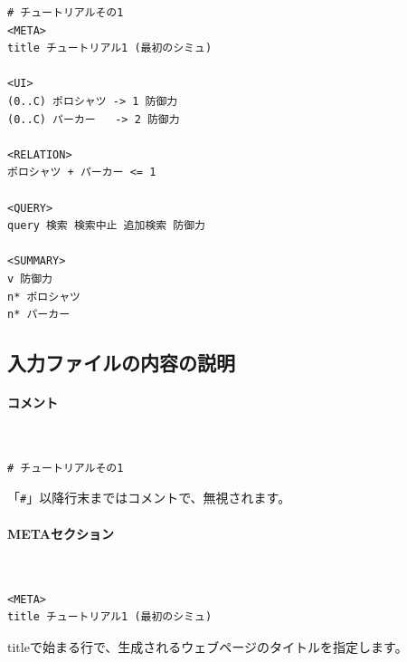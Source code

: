 \documentclass[dvipdfmx]{jsarticle}
\begin{document}
{\footnotesize\begin{mdframed}\begin{Verbatim}
# チュートリアルその1
<META>
title チュートリアル1 (最初のシミュ)

<UI>
(0..C) ポロシャツ -> 1 防御力
(0..C) パーカー   -> 2 防御力

<RELATION>
ポロシャツ + パーカー <= 1

<QUERY>
query 検索 検索中止 追加検索 防御力

<SUMMARY>
v 防御力
n* ポロシャツ
n* パーカー
\end{Verbatim}
\end{mdframed}}

\subsection{入力ファイルの内容の説明}

\paragraph{コメント}~\medskip
{\footnotesize\begin{mdframed}\begin{Verbatim}
# チュートリアルその1
\end{Verbatim}
\end{mdframed}}
\medskip

「\texttt{\#}」以降行末まではコメントで、無視されます。

\paragraph{METAセクション}~\medskip
{\footnotesize\begin{mdframed}\begin{Verbatim}
<META>
title チュートリアル1 (最初のシミュ)
\end{Verbatim}
\end{mdframed}}
\medskip

titleで始まる行で、生成されるウェブページのタイトルを指定します。

\begin{center}
\end{center}
\end{document}
